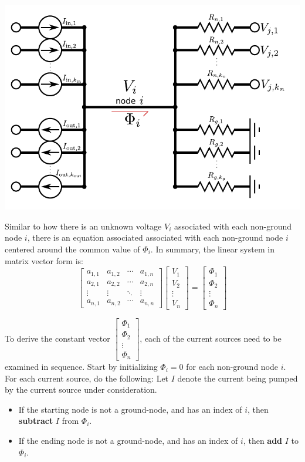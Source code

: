 \documentclass{article}
\begin{document}
\includegraphics[width = \textwidth]{current_flux}

Similar to how there is an unknown voltage \(V_i\) associated with each non-ground node \(i\), there is an equation associated associated with each non-ground node \(i\) centered around the common value of \(\Phi_i\). In summary, the linear system in matrix vector form is:
\[\begin{bmatrix}
a_{1,1} & a_{1,2} & \cdots & a_{1,n} \\ 
a_{2,1} & a_{2,2} & \cdots & a_{2,n} \\ 
\vdots & \vdots & \ddots & \vdots \\
a_{n,1} & a_{n,2} & \cdots & a_{n,n} 
\end{bmatrix}\begin{bmatrix}
V_1 \\ V_2 \\ \vdots \\ V_n 
\end{bmatrix} = \begin{bmatrix}
\Phi_1 \\ 
\Phi_2 \\ 
\vdots \\ 
\Phi_n 
\end{bmatrix}\]

To derive the constant vector \(\begin{bmatrix} \Phi_1 \\ \Phi_2 \\ \vdots \\ \Phi_n \end{bmatrix}\), each of the current sources need to be examined in sequence. Start by initializing \(\Phi_i = 0\) for each non-ground node \(i\). For each current source, do the following: Let \(I\) denote the current being pumped by the current source under consideration.
\begin{itemize}
\item If the starting node is not a ground-node, and has an index of \(i\), then {\bf subtract} \(I\) from \(\Phi_i\). 
\item If the ending node is not a ground-node, and has an index of \(i\), then {\bf add} \(I\) to \(\Phi_i\). 
\end{itemize}
\end{document}
